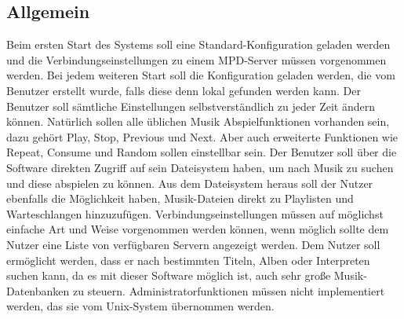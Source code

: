 \subsection{Allgemein}
Beim ersten Start des Systems soll eine Standard-Konfiguration geladen werden und die Verbindungseinstellungen
zu einem MPD-Server müssen vorgenommen werden. Bei jedem weiteren Start soll die Konfiguration geladen werden,
die vom Benutzer erstellt wurde, falls diese denn lokal gefunden werden kann. Der Benutzer soll sämtliche
Einstellungen selbstverständlich zu jeder Zeit ändern können.
Natürlich sollen alle üblichen Musik Abspielfunktionen vorhanden sein, dazu gehört Play, Stop, Previous
und Next. Aber auch erweiterte Funktionen wie Repeat, Consume und Random sollen einstellbar sein.
Der Benutzer soll über die Software direkten Zugriff auf sein Dateisystem haben, um nach Musik zu suchen und
diese abspielen zu können. Aus dem Dateisystem heraus soll der Nutzer ebenfalls die Möglichkeit haben, Musik-Dateien
direkt zu Playlisten und Warteschlangen hinzuzufügen.
Verbindungseinstellungen müssen auf möglichst einfache Art und Weise vorgenommen werden können, wenn möglich
sollte dem Nutzer eine Liste von verfügbaren Servern angezeigt werden. 
Dem Nutzer soll ermöglicht werden, dass er nach bestimmten Titeln, Alben oder Interpreten suchen kann, da 
es mit dieser Software möglich ist, auch sehr große Musik-Datenbanken zu steuern.
Administratorfunktionen müssen nicht implementiert werden, das sie vom Unix-System übernommen werden.
